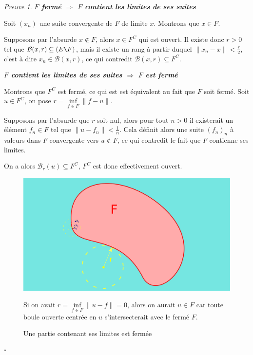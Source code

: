 \documentclass[]{article}
\theoremstyle{remark}
\newtheorem{myproof}{Preuve}
\theoremstyle{definition}
\newcommand{\cqfd}{
	\hfill$\square$
}
\newenvironment{proofpart}[1]{
	\leavevmode
	
	\noindent
	{\textit{\textbf{\boldmath #1}}}
	
}{
	\checkmark
}
\begin{document}
\begin{myproof}
	\begin{proofpart}{$F$ fermé $\Longrightarrow$ $F$ contient les limites de ses suites}

		Soit $(x_n)$ une suite convergente de $F$ de limite $x$. Montrons que $x \in F$.
		
		Supposons par l'absurde $x \not \in F$, alors $x \in F^C$ qui est ouvert. Il existe donc $r > 0$ tel que $\mathcal{B}(x, r) \subseteq (E \verb|\|F)$, mais il existe un rang à partir duquel $\|x_n-x\| < \frac{r}{2}$, c'est à dire $x_n \in \mathcal{B}(x, r)$, ce qui contredit $\mathcal{B}(x, r) \subseteq F^C$.
	\end{proofpart}
	
	
	\begin{proofpart}{$F$ contient les limites de ses suites $\Longrightarrow$ $F$ est fermé}
		Montrons que $F^C$ est fermé, ce qui est est équivalent au fait que $F$ soit fermé.
		Soit $u \in F^C$, on pose $r=\inf\limits_{f \in F} \|f-u\|$.
		
		Supposons par l'absurde que $r$ soit nul, alors pour tout $n>0$ il existerait un élément $f_n \in F$ tel que $\|u-f_n\| < \frac{1}{n}$. Cela définit alors une suite $(f_n)_n$ à valeurs dans $F$ convergente vers $u \notin F$, ce qui contredit le fait que $F$ contienne ses limites.
		
		On a alors $\mathcal{B}_r(u) \subseteq F^C$, $F^C$ est donc effectivement ouvert.
	\end{proofpart}
	\begin{figure}[h!]
		\centering
		\includegraphics[width=450pt]{Contient_ses_limites_implique_ferme}
		\caption{Une partie contenant ses limites est fermée}
		
		Si on avait $r=\inf\limits_{f \in F} \|u-f\|=0$, alors on aurait $u \in F$ car toute boule ouverte centrée en $u$ s'intersecterait avec le fermé $F$. 
	\end{figure}	
	\cqfd
\end{myproof}
\end{document}
